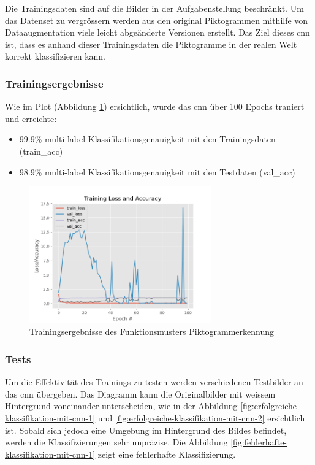 Die Trainingsdaten sind auf die Bilder in der Aufgabenstellung beschränkt. Um das Datenset zu vergrössern werden aus den original Piktogrammen mithilfe von Dataaugmentation viele leicht abgeänderte Versionen erstellt. Das Ziel dieses \acrshort{cnn} ist, dass es anhand dieser Trainingsdaten die Piktogramme in der realen Welt korrekt klassifizieren kann. %

\subsubsection{Trainingsergebnisse}
Wie im Plot (Abbildung \ref{fig:trainingsergebnisse}) ersichtlich, wurde das \acrshort{cnn} über 100 Epochs traniert und erreichte:
\begin{itemize}
    \item 99.9\% multi-label Klassifikationsgenauigkeit mit den Trainingsdaten (train\_acc)
    \item 98.9\% multi-label Klassifikationsgenauigkeit mit den Testdaten (val\_acc)
 \end{itemize}
 
\begin{figure}[H]
  \includegraphics[width=0.7\textwidth]{img/piktogrammerkennung/trainingsergebnisse_piktogram.png}
  \centering
  \caption{Trainingsergebnisse des Funktionsmusters Piktogrammerkennung}
  \label{fig:trainingsergebnisse}
\end{figure} 
   
\subsubsection{Tests}
Um die Effektivität des Trainings zu testen werden verschiedenen Testbilder an das \acrshort{cnn} übergeben. Das Diagramm kann die Originalbilder mit weissem Hintergrund voneinander unterscheiden, wie in der Abbildung \ref{fig:erfolgreiche-klassifikation-mit-cnn-1} und \ref{fig:erfolgreiche-klassifikation-mit-cnn-2} ersichtlich ist. Sobald sich jedoch eine Umgebung im Hintergrund des Bildes befindet, werden die Klassifizierungen sehr unpräzise. Die Abbildung \ref{fig:fehlerhafte-klassifikation-mit-cnn-1} zeigt eine fehlerhafte Klassifizierung.


